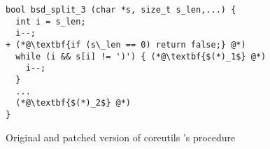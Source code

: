 \begin{figure}[H]
\centering
\begin{lstlisting}
bool bsd_split_3 (char *s, size_t s_len,...) {
  int i = s_len;
  i--;
+ (*@\textbf{if (s\_len == 0) return false;} @*)
  while (i && s[i] != ')') { (*@\textbf{$(*)_1$} @*)
    i--;
  }
  ...
  (*@\textbf{$(*)_2$} @*)
}
\end{lstlisting}
%
\caption{Original and patched version of coreutils 's  procedure}
\end{figure} 